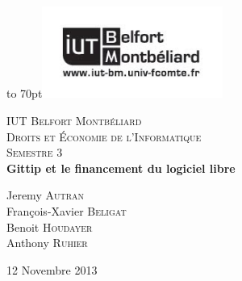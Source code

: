 \documentclass[12pt]{report}
\begin{document}
{
\begin{titlepage}

\vbox to 70pt{\hfill\includegraphics[height=3cm]{images/logo-iut}}\
\begin{center}

\textsc{\LARGE IUT Belfort Montbéliard}\\[1.5cm]

\textsc{\Large Droits et Économie de l'Informatique}\\[0.5cm]
\textsc{\Large Semestre 3}\\[5cm]


{ \huge \bfseries Gittip et le financement du logiciel libre}\\[5cm]

\begin{large}
Jeremy \textsc{Autran}\\[0.3em]
François-Xavier \textsc{Beligat}\\[0.3em]
Benoit \textsc{Houdayer}\\[0.3em]
Anthony \textsc{Ruhier}\\[0.3em]
\end{large}

\vfill

{\large 12 Novembre 2013}

\end{center}
\end{titlepage}
}

{\clearpage\mbox{}\thispagestyle{empty}\clearpage}
\setcounter{page}{1}

{
\large{
}
}


%






%


\tableofcontents
{}

%
%
\end{document}
